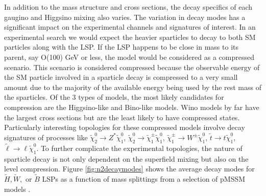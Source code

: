 

In addition to the mass structure and cross sections, the decay specifics of each gaugino and Higgsino mixing also varies. The variation in decay modes has a significant impact on the experimental channels and signatures of interest. In an experimental search we would expect the heavier sparticles to decay to both SM particles along with the LSP. If the LSP happens to be close in mass to its parent, say O(100) GeV or less, the model would be considered as a compressed scenario. This scenario is considered compressed because the observable energy of the SM particle involved in a sparticle decay is compressed to a very small amount due to the majority of the available energy being used by the rest mass of the sparticles. Of the 3 types of models, the most likely candidates for compression are the Higgsino-like and Bino-like models. Wino models by far have the largest cross sections but are the least likely to have compressed states. Particularly interesting topologies for these compressed models involve decay signatures of processes like $\tilde{\chi}^0_2 \rightarrow Z^*\tilde{\chi}^0_1 $, $\tilde{\chi}^0_2\rightarrow \tilde{\chi}^\pm_1 \tilde{\chi}^0_1 $, $\tilde{\chi}^\pm_1\rightarrow W^\pm \tilde{\chi}^0_1$, $\tilde{t}\rightarrow t \tilde{\chi}^0_1$, $\tilde{\ell}\rightarrow\ell \tilde{\chi}^0_1$. To further complicate the experimental topologies, the nature of sparticle decay is not only dependent on the superfield mixing but also on the level compression. Figure \ref{fig:n2decaymodes} shows the average decay modes for $\tilde{H}, \tilde{W},$ or $\tilde{B}$ LSPs as a function of mass splittings from a selection of pMSSM models \cite{ATLAS:2015wrn}.



